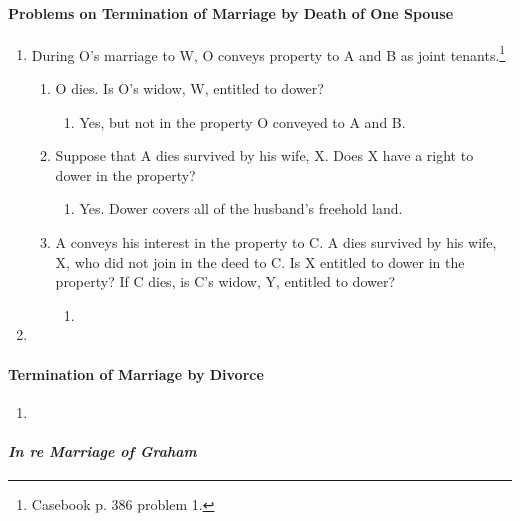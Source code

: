 \paragraph{Problems on Termination of Marriage by Death of One Spouse}

\begin{enumerate}
    \item During O's marriage to W, O conveys property to A and B as joint 
    tenants.\footnote{Casebook p. 386 problem 1.}
    \begin{enumerate}
        \item O dies. Is O's widow, W, entitled to dower?
        \begin{enumerate}
            \item Yes, but not in the property O conveyed to A and B.
        \end{enumerate}
        \item Suppose that A dies survived by his wife, X. Does X have a right 
        to dower in the property?
        \begin{enumerate}
            \item Yes. Dower covers all of the husband's freehold land.
        \end{enumerate}
        \item A conveys his interest in the property to C. A dies survived by 
        his wife, X, who did not join in the deed to C. Is X entitled to dower 
        in the property? If C dies, is C's widow, Y, entitled to dower?
        \begin{enumerate}
            \item %
        \end{enumerate}
    \end{enumerate}
    \item %
\end{enumerate}

\paragraph{Termination of Marriage by Divorce}

\begin{enumerate}
    \item %
\end{enumerate}

\paragraph{\emph{In re Marriage of Graham}}

